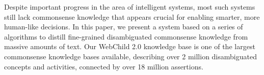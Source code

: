 Despite important progress in the area of intelligent systems, most such systems still lack commonsense knowledge that appears crucial for enabling smarter, more human-like decisions. In this paper, we present a system based on a series of algorithms to distill fine-grained disambiguated commonsense knowledge from massive amounts of text. Our WebChild 2.0 knowledge base is one of the largest commonsense knowledge bases available, describing over 2 million disambiguated concepts and activities, connected by over 18 million assertions.

